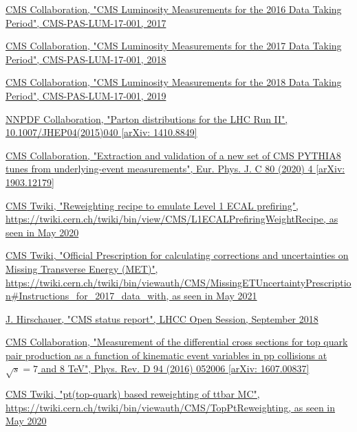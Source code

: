 \documentclass[a4paper, 10pt, openright]{report}
\begin{document}
\begin{thebibliography}{1}
\href{https://cds.cern.ch/record/2257069}{CMS Collaboration,
"CMS Luminosity Measurements for the 2016 Data Taking Period",
CMS-PAS-LUM-17-001, 2017}

\href{http://inspirehep.net/record/1677076}{CMS Collaboration,
"CMS Luminosity Measurements for the 2017 Data Taking Period",
CMS-PAS-LUM-17-001, 2018}

\href{http://inspirehep.net/record/1736713/}{CMS Collaboration,
"CMS Luminosity Measurements for the 2018 Data Taking Period",
CMS-PAS-LUM-17-001, 2019}

\href{https://arxiv.org/abs/1410.8849}{NNPDF Collaboration,
"Parton distributions for the LHC Run II", 10.1007/JHEP04(2015)040 [arXiv: 1410.8849]}

\href{https://arxiv.org/abs/1903.12179}{\ac{CMS} Collaboration,
"Extraction and validation of a new set of CMS PYTHIA8 tunes from underlying-event measurements", Eur. Phys. J. C 80 (2020) 4 [arXiv: 1903.12179]}

\href{https://twiki.cern.ch/twiki/bin/view/CMS/L1ECALPrefiringWeightRecipe}{\ac{CMS} Twiki,
"Reweighting recipe to emulate Level 1 ECAL prefiring", \url{https://twiki.cern.ch/twiki/bin/view/CMS/L1ECALPrefiringWeightRecipe}, as seen in May 2020}

\href{https://twiki.cern.ch/twiki/bin/viewauth/CMS/MissingETUncertaintyPrescription\#Instructions_for_2017_data_with}{\ac{CMS} Twiki,
"Official Prescription for calculating corrections and uncertainties on Missing Transverse Energy (MET)", \url{https://twiki.cern.ch/twiki/bin/viewauth/CMS/MissingETUncertaintyPrescription\#Instructions_for_2017_data_with}, as seen in May 2021}

\href{https://indico.cern.ch/event/744723/contributions/3077439/attachments/1714201/2764846/hirschauer_cms_lhcc_12sep2018.pdf}{J. Hirschauer,
"CMS status report",
LHCC Open Session, September 2018}

\href{https://arxiv.org/abs/1607.00837}{CMS Collaboration,
"Measurement of the differential cross sections for top quark pair production as a function of kinematic event variables in pp collisions at $\sqrt{s} = 7$ and 8 TeV",
Phys. Rev. D 94 (2016) 052006 [arXiv: 1607.00837]}

\href{https://twiki.cern.ch/twiki/bin/viewauth/CMS/TopPtReweighting}{\ac{CMS} Twiki,
"pt(top-quark) based reweighting of ttbar MC", \url{https://twiki.cern.ch/twiki/bin/viewauth/CMS/TopPtReweighting}, as seen in May 2020}


\end{thebibliography}
\end{document}
